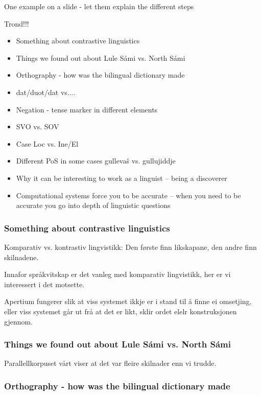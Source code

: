 \documentclass[a4paper,english,12pt]{article}
\begin{document}
One example on a slide - let them explain the different steps


Trond!!!

\begin{itemize}
\item Something about contrastive linguistics
\item Things we found out about Lule Sámi vs. North Sámi
\item Orthography - how was the bilingual dictionary made
\item dat/duot/dat vs....
\item Negation - tense marker in different elements
\item SVO vs. SOV
\item Case Loc vs. Ine/El
\item Different PoS in some cases gullevaš vs. gullujiddje
\item Why it can be interesting to work as a linguist -- being a discoverer
\item Computational systems force you to be accurate -- when you need to be accurate you go into depth of linguistic questions
\end{itemize}

\subsubsection{Something about contrastive linguistics}

Komparativ vs. kontrastiv lingvistikk: Den første finn likskapane, den andre finn skilnadene.

Innafor språkvitskap er det vanleg med komparativ lingvistikk, her er vi interessert i det motsette.

Apertium fungerer slik at viss systemet ikkje er i stand til å finne ei omsetjing, eller viss systemet går ut frå at det er likt, sklir ordet elelr konstruksjonen gjennom.

\subsubsection{Things we found out about Lule Sámi vs. North Sámi}

Parallellkorpuset vårt viser at det var fleire skilnader enn vi trudde.

\subsubsection{Orthography - how was the bilingual dictionary made}
\end{document}
